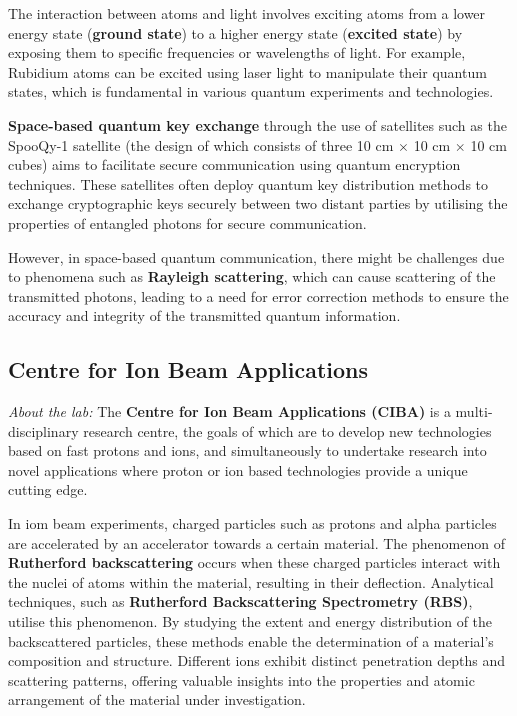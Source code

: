 \documentclass[12pt,a4paper]{article}
\begin{document}
The interaction between atoms and light involves exciting atoms from a lower energy state (\textbf{ground state}) to a higher energy state (\textbf{excited state}) by exposing them to specific frequencies or wavelengths of light. For example, Rubidium atoms can be excited using laser light to manipulate their quantum states, which is fundamental in various quantum experiments and technologies.

\textbf{Space-based quantum key exchange} through the use of satellites such as the SpooQy-1 satellite (the design of which consists of three 10 \unit{cm} $\times$ 10 \unit{cm} $\times$ 10 \unit{cm} cubes) aims to facilitate secure communication using quantum encryption techniques. These satellites often deploy quantum key distribution methods to exchange cryptographic keys securely between two distant parties by utilising the properties of entangled photons for secure communication.

However, in space-based quantum communication, there might be challenges due to phenomena such as \textbf{Rayleigh scattering}, which can cause scattering of the transmitted photons, leading to a need for error correction methods to ensure the accuracy and integrity of the transmitted quantum information.
\pagebreak

\subsection{Centre for Ion Beam Applications}
{\color{red}\textit{About the lab:}} The \textbf{Centre for Ion Beam Applications (CIBA)} is a multi-disciplinary research centre, the goals of which are to develop new technologies based on fast protons and ions, and simultaneously to undertake research into novel applications where proton or ion based technologies provide a unique cutting edge.

In iom beam experiments, charged particles such as protons and alpha particles are accelerated by an accelerator towards a certain material. The phenomenon of \textbf{Rutherford backscattering} occurs when these charged particles interact with the nuclei of atoms within the material, resulting in their deflection. Analytical techniques, such as \textbf{Rutherford Backscattering Spectrometry (RBS)}, utilise this phenomenon. By studying the extent and energy distribution of the backscattered particles, these methods enable the determination of a material's composition and structure. Different ions exhibit distinct penetration depths and scattering patterns, offering valuable insights into the properties and atomic arrangement of the material under investigation.
\end{document}
